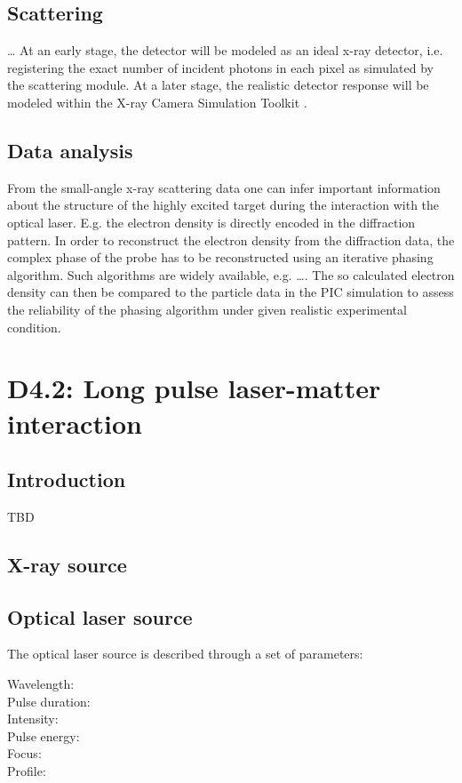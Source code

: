 \documentclass[a4paper]{article}
\begin{document}
\subsection{Scattering}
\ldots {}
At an early stage, the detector will be modeled as an ideal x-ray detector, i.e. registering the exact number of incident photons in each
pixel as simulated by the scattering module. At a later stage, the realistic detector response will be modeled within the
X-ray Camera Simulation Toolkit \cite{Joy2015}.%
%
\subsection{Data analysis}
From the small-angle x-ray scattering data one can infer important information about the structure of the highly excited target during
the interaction with the optical laser. E.g. the electron density is directly encoded in the diffraction pattern. In order to
reconstruct the electron density from the diffraction data, the complex phase of the probe has to be reconstructed using an iterative phasing
algorithm. Such algorithms are widely available, e.g. \ldots {}.
The so calculated electron density can then be compared to the particle data in the PIC simulation to assess the reliability of
the phasing algorithm under given realistic experimental condition. 

\section{D4.2: Long pulse laser-matter interaction\label{sec:long_pulse}}
\subsection{Introduction}
TBD
\subsection{X-ray source}
\subsection{Optical laser source}
The optical laser source is described through a set of parameters:
\begin{description}
  \item[Wavelength:]
  \item[Pulse duration:]
  \item[Intensity:]
  \item[Pulse energy:]
  \item[Focus:]
  \item[Profile:]
\end{description}
\end{document}
